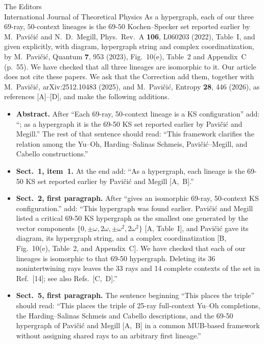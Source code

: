 \documentclass[11pt]{letter}
\begin{document}
\begin{letter}{The Editors\\
International Journal of Theoretical Physics}
As a hypergraph, each of our three $69$-ray, $50$-context lineages is the $69$-$50$ Kochen--Specker set reported earlier by M.~Pavi\v{c}i\'{c} and N.~D.~Megill, Phys.\ Rev.\ A \textbf{106}, L060203 (2022), Table~I, and given explicitly, with diagram, hypergraph string and complex coordinatization, by M.~Pavi\v{c}i\'{c}, Quantum \textbf{7}, 953 (2023), Fig.~10(e), Table~2 and Appendix~C (p.~55).
We have checked that all three lineages are isomorphic to it.
Our article does not cite these papers.
We ask that the Correction add them, together with M.~Pavi\v{c}i\'{c}, arXiv:2512.10483 (2025), and M.~Pavi\v{c}i\'{c}, Entropy \textbf{28}, 446 (2026), as references [A]--[D], and make the following additions.
\begin{itemize}[leftmargin=*]
\item \textbf{Abstract.} After ``Each 69-ray, 50-context lineage is a KS configuration'' add: ``; as a hypergraph it is the 69-50 KS set reported earlier by Pavi\v{c}i\'{c} and Megill.''
The rest of that sentence should read: ``This framework clarifies the relation among the Yu--Oh, Harding--Salinas Schmeis, Pavi\v{c}i\'{c}--Megill, and Cabello constructions.''
\item \textbf{Sect.~1, item~1.} At the end add: ``As a hypergraph, each lineage is the 69-50 KS set reported earlier by Pavi\v{c}i\'{c} and Megill [A,~B].''
\item \textbf{Sect.~2, first paragraph.} After ``gives an isomorphic 69-ray, 50-context KS configuration.'' add: ``This hypergraph was found earlier. Pavi\v{c}i\'{c} and Megill listed a critical 69-50 KS hypergraph as the smallest one generated by the vector components $\{0,\pm\omega,2\omega,\pm\omega^2,2\omega^2\}$ [A, Table~I], and Pavi\v{c}i\'{c} gave its diagram, its hypergraph string, and a complex coordinatization [B, Fig.~10(e), Table~2, and Appendix~C]. We have checked that each of our lineages is isomorphic to that 69-50 hypergraph. Deleting its 36 nonintertwining rays leaves the 33 rays and 14 complete contexts of the set in Ref.~[14]; see also Refs.~[C,~D].''
\item \textbf{Sect.~5, first paragraph.} The sentence beginning ``This places the triple'' should read: ``This places the triple of 25-ray full-context Yu--Oh completions, the Harding--Salinas Schmeis and Cabello descriptions, and the 69-50 hypergraph of Pavi\v{c}i\'{c} and Megill [A,~B] in a common MUB-based framework without assigning shared rays to an arbitrary first lineage.''
\end{itemize}


\end{letter}
\end{document}
